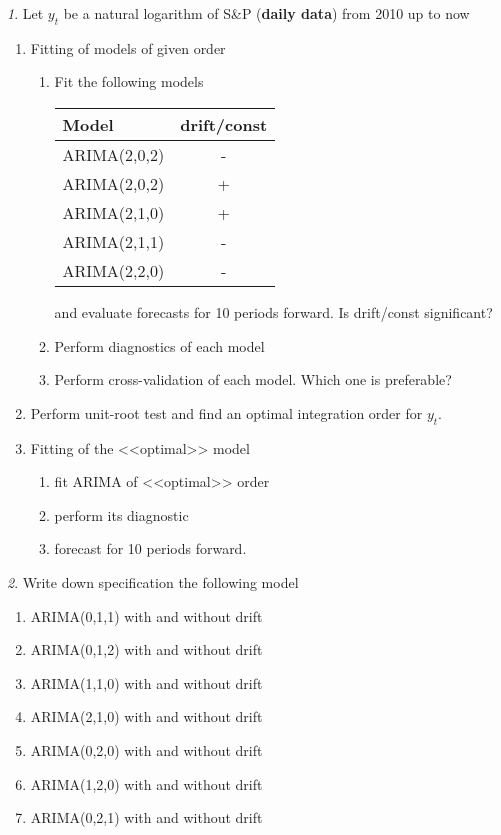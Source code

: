 \documentclass[12pt]{article}
\theoremstyle{remark}
\newtheorem{exercise}{}[section]
\begin{document}
\begin{exercise}
Let \(y_t\) be a natural logarithm of  S\&P (\textbf{daily data}) from 2010 up to now
\begin{enumerate}
	\item Fitting of models of given order
	\begin{enumerate}
		\item Fit the following models
		\begin{center}\small
			\begin{tabular}{l|c}
				Model & drift/const \\ \hline
				ARIMA(2,0,2) & - \\
				ARIMA(2,0,2) & + \\
				ARIMA(2,1,0) & + \\
				ARIMA(2,1,1) & - \\
				ARIMA(2,2,0) & - \\ \hline
			\end{tabular}
		\end{center} 
		and evaluate forecasts for 10 periods forward. Is drift/const significant?
		\item Perform diagnostics of each model
		\item Perform cross-validation of each model. Which one is preferable?
	\end{enumerate}
	\item Perform unit-root test and find an optimal integration order for  \(y_t\). 
	\item Fitting of the <<optimal>> model
	\begin{enumerate}
		\item fit ARIMA of <<optimal>> order
		\item perform its diagnostic
		\item forecast for 10 periods forward.
	\end{enumerate}
\end{enumerate}
\end{exercise}

\begin{exercise}
Write down specification the following model
\begin{enumerate}
	\item ARIMA(0,1,1) with and without drift
	\item ARIMA(0,1,2) with and without drift
	\item ARIMA(1,1,0) with and without drift
	\item ARIMA(2,1,0) with and without drift
	\item ARIMA(0,2,0) with and without drift
	\item ARIMA(1,2,0) with and without drift
	\item ARIMA(0,2,1) with and without drift
\end{enumerate}
\end{exercise}
\end{document}
